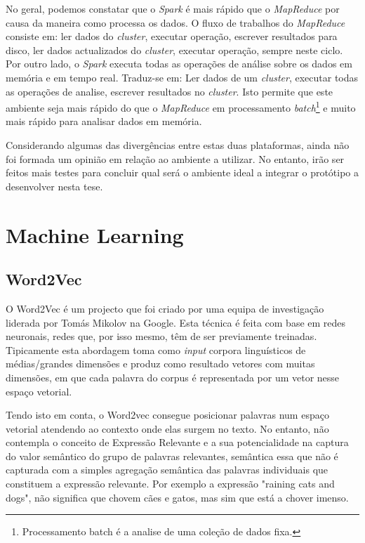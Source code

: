 No geral, podemos constatar que o \textit{Spark} é mais rápido que o \textit{MapReduce} por causa da maneira como processa os dados. O fluxo de trabalhos do \textit{MapReduce} consiste em: ler dados do \textit{cluster}, executar operação, escrever resultados para disco, ler dados actualizados do \textit{cluster}, executar operação, sempre neste ciclo. Por outro lado, o \textit{Spark} executa todas as operações de análise sobre os dados em memória e em tempo real. Traduz-se em: Ler dados de um \textit{cluster}, executar todas as operações de analise, escrever resultados no \textit{cluster}. Isto permite que este ambiente seja mais rápido do que o \textit{MapReduce} em processamento \textit{batch}\footnote{Processamento batch é a analise de uma coleção de dados fixa.} e muito mais rápido para analisar dados em memória. 

Considerando algumas das divergências entre estas duas plataformas, ainda não foi formada um opinião em relação ao ambiente a utilizar. No entanto, irão ser feitos mais testes para concluir qual será o ambiente ideal a integrar o protótipo a desenvolver nesta tese.

\section{Machine Learning}

\subsection{Word2Vec}
O Word2Vec é um projecto que foi criado por uma equipa de investigação liderada por Tomás Mikolov na Google. Esta técnica é feita com base em redes neuronais, redes que, por isso mesmo, têm de ser previamente treinadas. Tipicamente esta abordagem toma como \textit{input} corpora linguísticos de médias/grandes dimensões e produz como resultado vetores com muitas dimensões, em que cada palavra do corpus é representada por um vetor nesse espaço vetorial\cite{word2vec}. 

Tendo isto em conta, o Word2vec consegue posicionar palavras num espaço vetorial atendendo ao contexto onde elas surgem no texto. No entanto, não contempla o conceito de Expressão Relevante e a sua potencialidade na captura do valor semântico do grupo de palavras relevantes, semântica essa que não é capturada com a simples agregação semântica das palavras individuais que constituem a expressão relevante. Por exemplo a expressão "raining cats and dogs", não significa que chovem cães e gatos, mas sim que está a chover imenso. 


